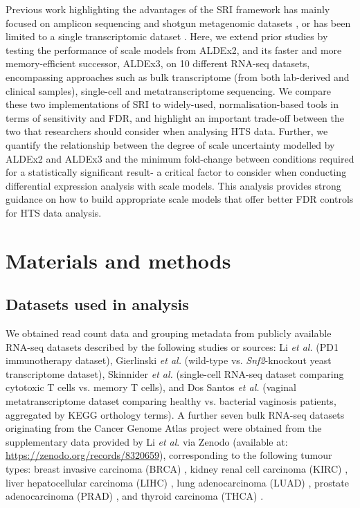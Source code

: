 \documentclass[10pt,letterpaper]{article}
\begin{document}
Previous work highlighting the advantages of the SRI framework has mainly focused on amplicon sequencing and shotgun metagenomic datasets \cite{konnaris_uncertainty_2025}, or has been limited to a single transcriptomic dataset \cite{gloor_explicit_2025}. Here, we extend prior studies by testing the performance of scale models from ALDEx2, and its faster and more memory-efficient successor, ALDEx3, on 10 different RNA-seq datasets, encompassing approaches such as bulk transcriptome (from both lab-derived and clinical samples), single-cell and metatranscriptome sequencing. We compare these two implementations of SRI to widely-used, normalisation-based tools in terms of sensitivity and FDR, and highlight an important trade-off between the two that researchers should consider when analysing HTS data. Further, we quantify the relationship between the degree of scale uncertainty modelled by ALDEx2 and ALDEx3 and the minimum fold-change between conditions required for a statistically significant result- a critical factor to consider when conducting differential expression analysis with scale models. This analysis provides strong guidance on how to build appropriate scale models that offer better FDR controls for HTS data analysis.


\section*{Materials and methods}

\subsection*{Datasets used in analysis}
We obtained read count data and grouping metadata from publicly available RNA-seq datasets described by the following studies or sources: Li \textit{et al.} \cite{li_exaggerated_2022} (PD1 immunotherapy dataset), Gierlinski \textit{et al.} \cite{gierlinski_statistical_2015} (wild-type vs. \textit{Snf2}-knockout yeast transcriptome dataset), Skinnider \textit{et al.} \cite{skinnider_evaluating_2019} (single-cell RNA-seq dataset comparing cytotoxic T cells vs. memory T cells), and Dos Santos \textit{et al.} \cite{dos_santos_vaginal_2024} (vaginal metatranscriptome dataset comparing healthy vs. bacterial vaginosis patients, aggregated by KEGG orthology terms). A further seven bulk RNA-seq datasets originating from the Cancer Genome Atlas project \cite{weinstein_cancer_2013} were obtained from the supplementary data provided by Li \textit{et al}. via Zenodo \cite{li_supplement_2022} (available at: \url{https://zenodo.org/records/8320659}), corresponding to the following tumour types: breast invasive carcinoma (BRCA) \cite{tcga_brca_2012,tcga_brca_2015}, kidney renal cell carcinoma (KIRC) \cite{tcga_kirc_2013}, liver hepatocellular carcinoma (LIHC) \cite{tcga_lihc_2017}, lung adenocarcinoma (LUAD) \cite{tcga_luad_2016}, prostate adenocarcinoma (PRAD) \cite{tcga_prad_2015}, and thyroid carcinoma (THCA) \cite{tcga_thca_2014}.
\end{document}
